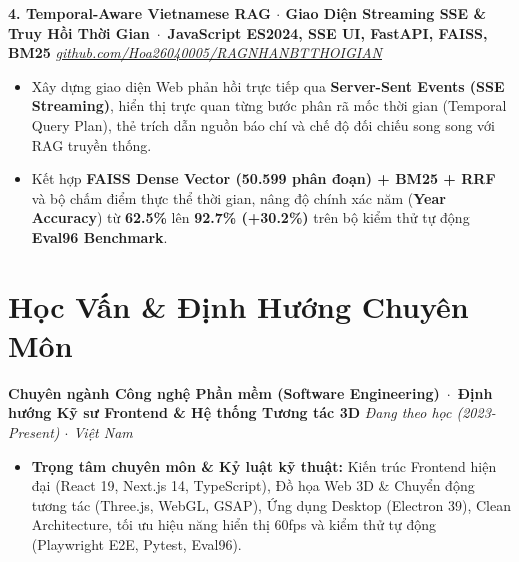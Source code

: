 \documentclass[10pt,a4paper]{article}
\newcommand{\resumeProject}[3]{
  \vspace{2pt}
  \noindent\textbf{#1} \,$\cdot$\, {\footnotesize\textbf{\color{accent}#2}} \hfill {\footnotesize\textit{#3}} \\
}
\begin{document}
\resumeProject{4. Temporal-Aware Vietnamese RAG $\cdot$ Giao Diện Streaming SSE \& Truy Hồi Thời Gian}{JavaScript ES2024, SSE UI, FastAPI, FAISS, BM25}{\href{https://github.com/Hoa26040005/RAGNHANBTTHOIGIAN}{github.com/Hoa26040005/RAGNHANBTTHOIGIAN}}
{\footnotesize
\begin{itemize}
  \item Xây dựng giao diện Web phản hồi trực tiếp qua \textbf{Server-Sent Events (SSE Streaming)}, hiển thị trực quan từng bước phân rã mốc thời gian (Temporal Query Plan), thẻ trích dẫn nguồn báo chí và chế độ đối chiếu song song với RAG truyền thống.
  \item Kết hợp \textbf{FAISS Dense Vector (50.599 phân đoạn) + BM25 + RRF} và bộ chấm điểm thực thể thời gian, nâng độ chính xác năm (\textbf{Year Accuracy}) từ \textbf{62.5\%} lên \textbf{92.7\% (+30.2\%)} trên bộ kiểm thử tự động \textbf{Eval96 Benchmark}.
\end{itemize}
}

\section{Học Vấn \& Định Hướng Chuyên Môn}
\resumeProject{Chuyên ngành Công nghệ Phần mềm (Software Engineering)}{Định hướng Kỹ sư Frontend \& Hệ thống Tương tác 3D}{Đang theo học (2023-Present) $\cdot$ Việt Nam}
{\footnotesize
\begin{itemize}
  \item \textbf{Trọng tâm chuyên môn \& Kỷ luật kỹ thuật:} Kiến trúc Frontend hiện đại (React 19, Next.js 14, TypeScript), Đồ họa Web 3D \& Chuyển động tương tác (Three.js, WebGL, GSAP), Ứng dụng Desktop (Electron 39), Clean Architecture, tối ưu hiệu năng hiển thị 60fps và kiểm thử tự động (Playwright E2E, Pytest, Eval96).
\end{itemize}
}
\end{document}
